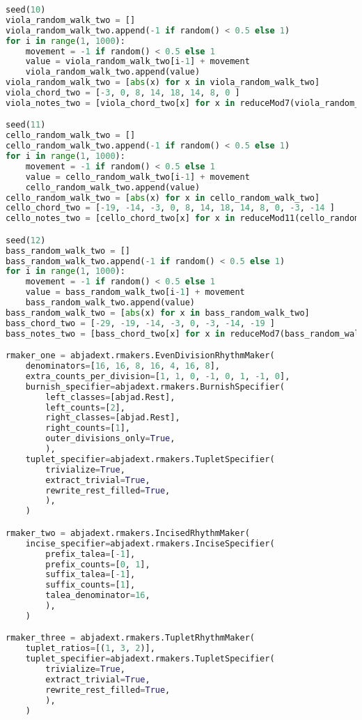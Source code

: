 \begin{lstlisting}[language=Python, caption=Tianshu Segment\_II]
seed(10)
viola_random_walk_two = []
viola_random_walk_two.append(-1 if random() < 0.5 else 1)
for i in range(1, 1000):
    movement = -1 if random() < 0.5 else 1
    value = viola_random_walk_two[i-1] + movement
    viola_random_walk_two.append(value)
viola_random_walk_two = [abs(x) for x in viola_random_walk_two]
viola_chord_two = [-3, 0, 8, 14, 18, 14, 8, 0 ]
viola_notes_two = [viola_chord_two[x] for x in reduceMod7(viola_random_walk_two)]

seed(11)
cello_random_walk_two = []
cello_random_walk_two.append(-1 if random() < 0.5 else 1)
for i in range(1, 1000):
    movement = -1 if random() < 0.5 else 1
    value = cello_random_walk_two[i-1] + movement
    cello_random_walk_two.append(value)
cello_random_walk_two = [abs(x) for x in cello_random_walk_two]
cello_chord_two = [-19, -14, -3, 0, 8, 14, 18, 14, 8, 0, -3, -14 ]
cello_notes_two = [cello_chord_two[x] for x in reduceMod11(cello_random_walk_two)]

seed(12)
bass_random_walk_two = []
bass_random_walk_two.append(-1 if random() < 0.5 else 1)
for i in range(1, 1000):
    movement = -1 if random() < 0.5 else 1
    value = bass_random_walk_two[i-1] + movement
    bass_random_walk_two.append(value)
bass_random_walk_two = [abs(x) for x in bass_random_walk_two]
bass_chord_two = [-29, -19, -14, -3, 0, -3, -14, -19 ]
bass_notes_two = [bass_chord_two[x] for x in reduceMod7(bass_random_walk_two)]

rmaker_one = abjadext.rmakers.EvenDivisionRhythmMaker(
    denominators=[16, 16, 8, 16, 4, 16, 8],
    extra_counts_per_division=[1, 1, 0, -1, 0, 1, -1, 0],
    burnish_specifier=abjadext.rmakers.BurnishSpecifier(
        left_classes=[abjad.Rest],
        left_counts=[2],
        right_classes=[abjad.Rest],
        right_counts=[1],
        outer_divisions_only=True,
        ),
    tuplet_specifier=abjadext.rmakers.TupletSpecifier(
        trivialize=True,
        extract_trivial=True,
        rewrite_rest_filled=True,
        ),
    )

rmaker_two = abjadext.rmakers.IncisedRhythmMaker(
    incise_specifier=abjadext.rmakers.InciseSpecifier(
        prefix_talea=[-1],
        prefix_counts=[0, 1],
        suffix_talea=[-1],
        suffix_counts=[1],
        talea_denominator=16,
        ),
    )

rmaker_three = abjadext.rmakers.TupletRhythmMaker(
    tuplet_ratios=[(1, 3, 2)],
    tuplet_specifier=abjadext.rmakers.TupletSpecifier(
        trivialize=True,
        extract_trivial=True,
        rewrite_rest_filled=True,
        ),
    )


\end{lstlisting}

